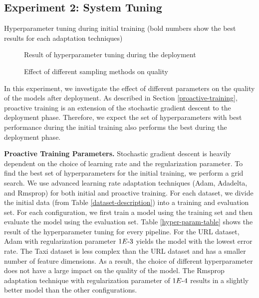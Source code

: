 \subsection{Experiment 2: System Tuning}
\begin{table*}[t]
\centering
\begin{adjustbox}{max width=\textwidth}

\end{adjustbox}
\caption{Hyperparameter tuning during initial training (bold numbers show the best results for each adaptation techniques)}
 \vspace{-25pt}
\label{hyper-param-table}
\end{table*}
\begin{figure}[!h]
\centering
\resizebox{\columnwidth}{!}{}
\caption{Result of hyperparameter tuning during the deployment}
 \vspace{-5pt}
\label{hyper-param-figure}
\end{figure}
\begin{figure}[!h]
\centering
\resizebox{\columnwidth}{!}{}
\caption{Effect of different sampling methods on quality}
 \vspace{-5pt}
\label{sampling-method-figure}
\end{figure}
In this experiment, we investigate the effect of different parameters on the quality of the models after deployment.
As described in Section \ref{proactive-training}, proactive training is an extension of the stochastic gradient descent to the deployment phase.
Therefore, we expect the set of hyperparameters with best performance during the initial training also performs the best during the deployment phase.

\textbf{Proactive Training Parameters. }
Stochastic gradient descent is heavily dependent on the choice of learning rate and the regularization parameter.
To find the best set of hyperparameters for the initial training, we perform a grid search.
We use advanced learning rate adaptation techniques (Adam, Adadelta, and Rmsprop) for both initial and proactive training.
For each dataset, we divide the initial data (from Table \ref{dataset-description}) into a training and evaluation set.
For each configuration, we first train a model using the training set and then evaluate the model using the evaluation set.
Table \ref{hyper-param-table} shows the result of the hyperparameter tuning for every pipeline.
For the URL dataset, Adam with regularization parameter $1E{\text -}3$ yields the model with the lowest error rate.
The Taxi dataset is less complex than the URL dataset and has a smaller number of feature dimensions.
As a result, the choice of different hyperparameter does not have a large impact on the quality of the model.
The Rmsprop adaptation technique with regularization parameter of $1E{\text -}4$ results in a slightly better model than the other configurations.

